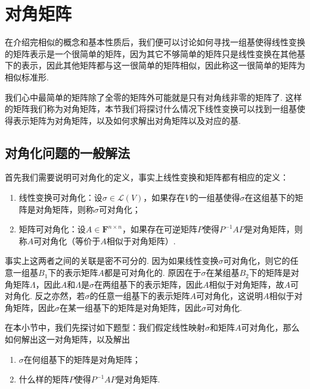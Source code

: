 \section{对角矩阵}

在介绍完相似的概念和基本性质后，我们便可以讨论如何寻找一组基使得线性变换的矩阵表示是一个很简单的矩阵，因为其它不够简单的矩阵只是线性变换在其他基下的表示，因此其他矩阵都与这一很简单的矩阵相似，因此称这一很简单的矩阵为相似标准形.

我们心中最简单的矩阵除了全零的矩阵外可能就是只有对角线非零的矩阵了. 这样的矩阵我们称为对角矩阵，本节我们将探讨什么情况下线性变换可以找到一组基使得表示矩阵为对角矩阵，以及如何求解出对角矩阵以及对应的基.

\subsection{对角化问题的一般解法}

首先我们需要说明可对角化的定义，事实上线性变换和矩阵都有相应的定义：
\begin{definition}
    \begin{enumerate}
        \item 线性变换可对角化：设$\sigma\in\mathcal{L}(V)$，如果存在$V$的一组基使得$\sigma$在这组基下的矩阵是对角矩阵，则称$\sigma$可对角化；

        \item 矩阵可对角化：设$A\in\mathbf{F}^{n\times n}$，如果存在可逆矩阵$P$使得$P^{-1}AP$是对角矩阵，则称$A$可对角化（等价于$A$相似于对角矩阵）.
    \end{enumerate}
\end{definition}

事实上这两者之间的关联是密不可分的. 因为如果线性变换$\sigma$可对角化，则它的任意一组基$B_1$下的表示矩阵$A$都是可对角化的. 原因在于$\sigma$在某组基$B_2$下的矩阵是对角矩阵$\varLambda$，因此$A$和$\varLambda$是$\sigma$在两组基下的表示矩阵，因此$A$相似于对角矩阵，故$A$可对角化. 反之亦然，若$\sigma$的任意一组基下的表示矩阵$A$可对角化，这说明$A$相似于对角矩阵，因此$\sigma$在某一组基下的矩阵是对角矩阵，因此$\sigma$可对角化.

在本小节中，我们先探讨如下题型：我们假定线性映射$\sigma$和矩阵$A$可对角化，那么如何解出这一对角矩阵，以及解出
\begin{enumerate}
    \item $\sigma$在何组基下的矩阵是对角矩阵；

    \item 什么样的矩阵$P$使得$P^{-1}AP$是对角矩阵.
\end{enumerate}

